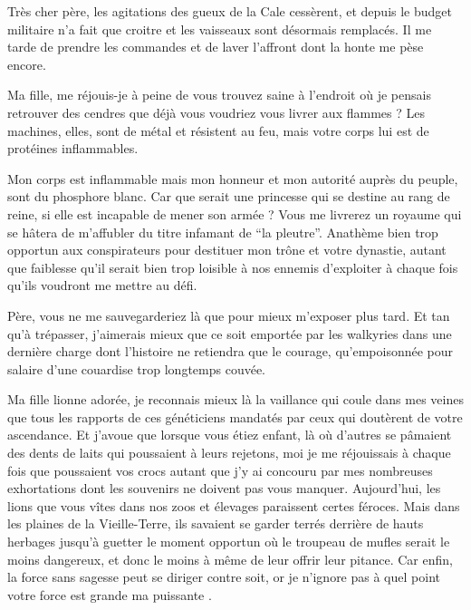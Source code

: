 \scene

\StageDirII{\ela, \roi}




\begin{drama}
  \elaspeaks  Très cher père, les agitations des gueux de la Cale cessèrent, et depuis le budget militaire n’a fait que croitre et les vaisseaux sont désormais remplacés. Il me tarde de prendre les commandes et de laver l’affront dont la honte me pèse encore.

  \roispeaks  Ma fille, me réjouis-je à peine de vous trouvez saine à l’endroit où je pensais retrouver des cendres que déjà vous voudriez vous livrer aux flammes ? Les machines, elles, sont de métal et résistent au feu, mais votre corps lui est de protéines inflammables.

  \elaspeaks Mon corps est inflammable mais mon honneur et mon autorité auprès du peuple, sont du phosphore blanc. Car que serait une princesse qui se destine au rang de reine, si elle est incapable de mener son armée ? Vous me livrerez un royaume qui se hâtera de m’affubler du titre infamant de \enquote{\princesse la pleutre}. Anathème  bien trop opportun aux conspirateurs pour destituer mon trône et votre dynastie, autant que faiblesse qu’il serait bien trop loisible à nos ennemis d’exploiter à chaque fois qu’ils voudront me mettre au défi.

  Père, vous ne me sauvegarderiez là que pour mieux m’exposer plus tard. Et tan qu’à trépasser, j’aimerais mieux que ce soit emportée par les walkyries dans une dernière charge dont l’histoire ne retiendra que le courage, qu’empoisonnée pour salaire d’une couardise trop longtemps  couvée.

  \roispeaks  Ma fille lionne adorée, je reconnais mieux là la vaillance qui coule dans mes veines que tous les rapports de ces généticiens mandatés par ceux qui doutèrent de votre ascendance. Et j’avoue que lorsque vous étiez enfant, là où d’autres se pâmaient des dents de laits qui poussaient à leurs rejetons, moi je me réjouissais à chaque fois que poussaient vos crocs autant que j’y ai concouru par mes nombreuses exhortations dont les souvenirs ne doivent pas vous manquer. Aujourd’hui, les lions que vous vîtes dans nos zoos et élevages paraissent certes féroces. Mais dans les plaines de la Vieille-Terre, ils savaient se garder terrés derrière de hauts herbages jusqu’à guetter le moment opportun où le troupeau de mufles serait le moins dangereux, et donc le moins à même de leur offrir leur pitance. Car enfin, la force sans sagesse peut se diriger contre soit, or je n’ignore pas à quel point votre force est grande ma puissante \princesse{}.


\end{drama}

